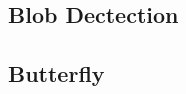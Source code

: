 \documentclass[final]{cvpr}
\begin{document}
\begin{appendices}
\section{Blob Dectection}\label{sec: allblob}
\subsection{Butterfly}





\end{appendices}
\end{document}
